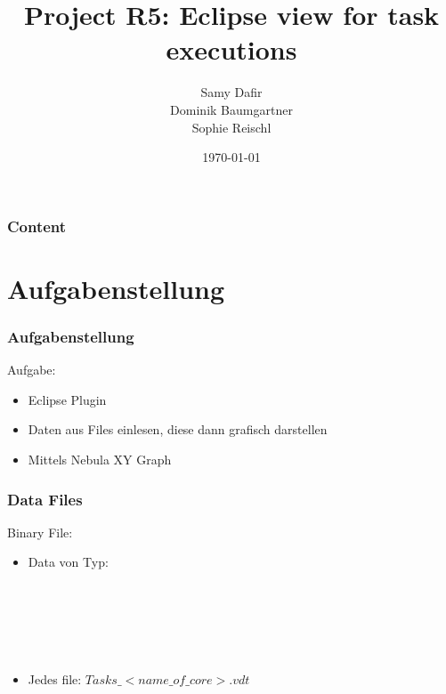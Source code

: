 \documentclass{beamer}
\title{Project R5: Eclipse view for task executions}
\author[]{Samy Dafir\\Dominik Baumgartner\\ Sophie Reischl }
\date{\today}
\begin{document}
\frame{\titlepage}

\begin{frame}
    \frametitle{Content} 
    \tableofcontents 
\end{frame}

\section{Aufgabenstellung}
\begin{frame}
	\frametitle{Aufgabenstellung}
    \begin{block}{Aufgabe:}
	    \begin{itemize}
		    \item Eclipse Plugin
		    \item Daten aus Files einlesen, diese dann grafisch darstellen 
            \item Mittels Nebula XY Graph            
	    \end{itemize}
    \end{block}
\end{frame}
\begin{frame}
	\frametitle{Data Files}
    \begin{block}{Binary File:}
	    \begin{itemize}
		    \item Data von Typ:\\
			\\
			\\
			\\
			\\
			\\
		    \item Jedes file: $Tasks\_<name\_of\_core>.vdt$
	    \end{itemize}
    \end{block}
\end{frame}
\end{document}
